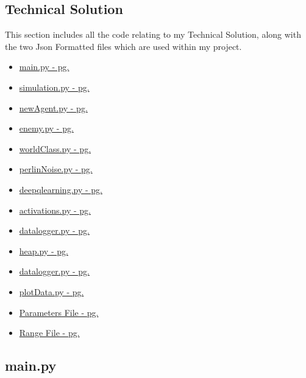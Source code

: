 \begin{flushleft}
    \section{Technical Solution}
        This section includes all the code relating to my Technical Solution, along with the two Json Formatted files which
        are used within my project. 

        \begin{itemize}
            \item \hyperref[sec:main.py]{main.py - pg. \pageref{sec:main.py}}
            \item \hyperref[sec:simulation.py]{simulation.py - pg. \pageref{sec:simulation.py}}
            \item \hyperref[sec:newAgent.py]{newAgent.py - pg. \pageref{sec:newAgent.py}}
            \item \hyperref[sec:enemy.py]{enemy.py - pg. \pageref{sec:enemy.py}}
            \item \hyperref[sec:worldClass.py]{worldClass.py - pg. \pageref{sec:worldClass.py}}
            \item \hyperref[sec:perlinNoise.py]{perlinNoise.py - pg. \pageref{sec:perlinNoise.py}}
            \item \hyperref[sec:deepqlearning.py]{deepqlearning.py - pg. \pageref{sec:deepqlearning.py}}
            \item \hyperref[sec:activations.py]{activations.py - pg. \pageref{sec:activations.py}}
            \item \hyperref[sec:datalogger.py]{datalogger.py - pg. \pageref{sec:datalogger.py}}
            \item \hyperref[sec:heap.py]{heap.py - pg. \pageref{sec:heap.py}}
            \item \hyperref[sec:datalogger.py]{datalogger.py - pg. \pageref{sec:datalogger.py}}
            \item \hyperref[sec:plotData.py]{plotData.py - pg. \pageref{sec:plotData.py}}
            \item \hyperref[sec:paramfile]{Parameters File - pg. \pageref{sec:paramfile}}
            \item \hyperref[sec:rangefile]{Range File - pg. \pageref{sec:rangefile}}
        \end{itemize}

        \label{sec:main.py}
        \subsection{main.py}
        \inputminted[frame=leftline,framesep=2mm,baselinestretch=1.2,fontsize=\small,linenos,breaklines]{python}{../Scripts/main.py}


\end{flushleft}
